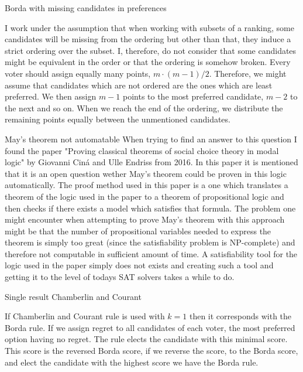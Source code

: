 \documentclass[12pt]{article}
\newenvironment{question}[2][Question]{\begin{trivlist}
\item[\hskip \labelsep {\bfseries #1}\hskip \labelsep {\bfseries #2.}]}{\end{trivlist}}
\newenvironment{answer}[2][Answer]{\begin{trivlist}
\item[\hskip \labelsep {\bfseries #1}\hskip \labelsep {\bfseries #2:}]}{\end{trivlist}}
\begin{document}
\begin{question}{2}{}


\end{question}
\begin{answer}{a)}{Borda with missing candidates in preferences}

I work under the assumption that when working with subsets of a ranking, some candidates will be missing from the ordering but other than that, they induce a strict ordering over the subset. I, therefore, do not consider that some candidates might be equivalent in the order or that the ordering is somehow broken. Every voter should assign equally many points, $m \cdot (m-1)/2$. Therefore, we might assume that candidates which are not ordered are the ones which are least preferred. We then assign $m-1$ points to the most preferred candidate, $m-2$ to the next and so on. When we reach the end of the ordering, we distribute the remaining points equally between the unmentioned candidates.

\end{answer}
\begin{answer}{b)}{May's theorem not automatable}
When trying to find an answer to this question I found the paper "Proving classical theorems of social choice theory in modal logic" by Giovanni Ciná and Ulle Endriss from 2016. In this paper it is mentioned that it is an open question wether May's theorem could be proven in this logic automatically. The proof method used in this paper is a one which translates a theorem of the logic used in the paper to a theorem of propositional logic and then checks if there exists a model which satisfies that formula. The problem one might encounter when attempting to prove May's theorem with this approach might be that the number of propositional variables needed to express the theorem is simply too great (since the satisfiability problem is NP-complete) and therefore not computable in sufficient amount of time. A satisfiability tool for the logic used in the paper simply does not exists and creating such a tool and getting it to the level of todays SAT solvers takes a while to do.
\end{answer}
\begin{answer}{c)}{Single result Chamberlin and Courant}

If Chamberlin and Courant rule is used with $k=1$ then it corresponds with the Borda rule. If we assign regret to all candidates of each voter, the most preferred option having no regret. The rule elects the candidate with this minimal score. This score is the reversed Borda score, if we reverse the score, to the Borda score, and elect the candidate with the highest score we have the Borda rule.
\end{answer}
\end{document}
